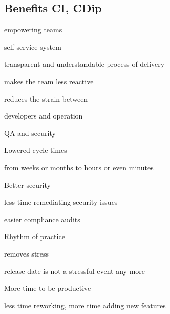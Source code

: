 \documentclass[a4paper,14pt, twocolumn]{extarticle}
\begin{document}
		\subsection{Benefits CI, CDip}
		\begin{compactitem}
			\item empowering teams
			\begin{compactitem}
				\item self service system 
				\item transparent and understandable process of delivery 
				\item makes the team less reactive 
				\item reduces the strain between
				\begin{compactitem}
					\item developers and operation 
					\item QA and security
				\end{compactitem}
			\end{compactitem}
			\item Lowered cycle times
			\begin{compactitem}
				\item from weeks or months to hours or even minutes
			\end{compactitem}
			\item Better security
			\begin{compactitem}
				\item less time remediating security issues 
				\item easier compliance audits
			\end{compactitem}
			\item Rhythm of practice
			\begin{compactitem}
				\item removes stress 
				\item release date is not a stressful event any more
			\end{compactitem}
			\item More time to be productive
			\begin{compactitem}
				\item less time reworking, more time adding new features
			\end{compactitem}
		\end{compactitem}
\end{document}
